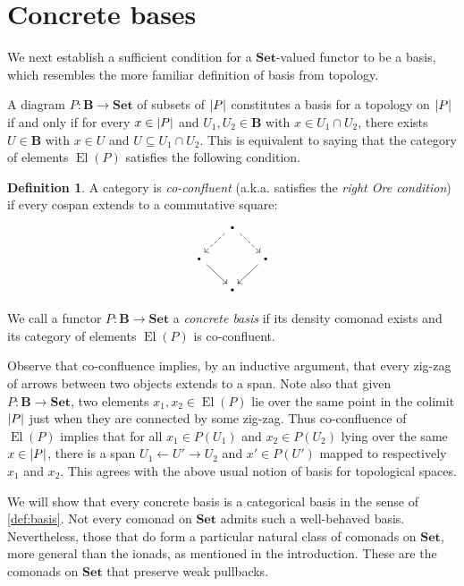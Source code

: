 \documentclass[11pt, oneside, article]{memoir}
\theoremstyle{plain}
\theoremstyle{definition}
\newtheorem{definition}[def]{Definition}
\theoremstyle{remark}
\DeclareMathOperator{\El}{El}
\DeclarePairedDelimiter{\abs}{\lvert}{\rvert}
\newcommand{\ot}{\leftarrow}
\newcommand{\namedcat}[1]{\mathbf{#1}}
\newcommand{\cat}[1]{\mathbf{#1}}
\newcommand{\Set}{\namedcat{Set}}
\newcommand{\pts}[1]{{\abs{#1}}}
\newcommand{\ph}[1]{#1}
\newcommand{\smbullet}{\scalebox{0.6}{$\bullet$}}
\newcommand{\xU}{U}
\newcommand{\bB}{\cat{B}}
\newcommand{\pP}{\ph{P}}
\begin{document}
\section{Concrete bases}\label{sec:coconfluence}

We next establish a sufficient condition for a $\Set$-valued functor
to be a basis, which resembles the more familiar definition of basis
from topology.

A diagram $\pP \colon \bB \to \Set$ of subsets of $\pts{\pP}$
constitutes a basis for a topology on $\pts{\pP}$ if and only if for
every $x \in \pts{\pP}$ and $\xU_1, \xU_2 \in \bB$ with
$x \in \xU_1 \cap \xU_2$, there exists $\xU \in \bB$ with $x \in \xU$
and $\xU \subseteq \xU_1 \cap \xU_2$. This is equivalent to saying that
the category of elements $\El(\pP)$ satisfies the following condition.

\begin{definition}\label{def:influent}
  A category is \emph{co-confluent} (a.k.a. satisfies the \emph{right
    Ore condition}) if every cospan extends to a commutative square:
  \[\begin{tikzcd}[column sep=15pt, row sep=15pt]
      & \smbullet \\
      \smbullet && \smbullet \\
      & \smbullet
      \arrow[dashed, from=1-2, to=2-1]
      \arrow[dashed, from=1-2, to=2-3]
      \arrow[from=2-1, to=3-2]
      \arrow[from=2-3, to=3-2]
    \end{tikzcd}\]

  We call a functor $\pP \colon \bB \to \Set$ a \emph{concrete basis}
  if its density comonad exists and its category of elements
  $\El(\pP)$ is co-confluent.
\end{definition}

Observe that co-confluence implies, by an inductive argument, that
every zig-zag of arrows between two objects extends to a span. Note
also that given $\pP \colon \bB \to \Set$, two elements
$x_1, x_2 \in \El(\pP)$ lie over the same point in the colimit
$\pts{\pP}$ just when they are connected by some zig-zag. Thus
co-confluence of $\El(\pP)$ implies that for all $x_1 \in \pP(\xU_1)$
and $x_2 \in \pP(\xU_2)$ lying over the same $x \in \pts{\pP}$,
there is a span $\xU_1 \ot \xU' \to \xU_2$ and $x' \in \pP(\xU')$
mapped to respectively $x_1$ and $x_2$. This agrees with the above
usual notion of basis for topological spaces.

We will show that every concrete basis is a categorical basis in the
sense of \cref{def:basis}. Not every comonad on $\Set$ admits such a
well-behaved basis. Nevertheless, those that do form a particular
natural class of comonads on $\Set$, more general than the ionads, as
mentioned in the introduction. These are the comonads on $\Set$ that
preserve weak pullbacks.
\end{document}
